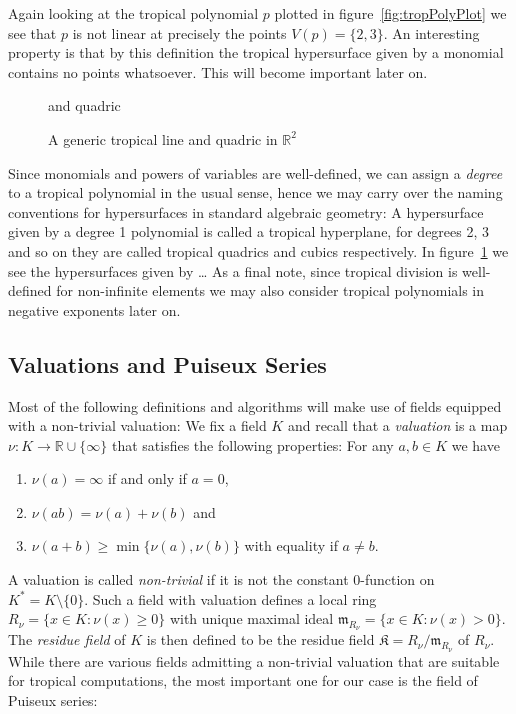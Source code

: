\documentclass[
  paper=a4,
  DIV=14,
  fontsize=12pt,
  titlepage,
  bibliography=totoc,
  listof=totoc,
  pagesize=pdftex
]{scrartcl}
\numberwithin{figure}{section}
\numberwithin{equation}{section}
\numberwithin{table}{section}
\newcommand*\setR{\mathds{R}}
\theoremstyle{definition}
\numberwithin{definition}{section}
\begin{document}
Again looking at the tropical polynomial $p$ plotted in figure~\ref{fig:tropPolyPlot} we
see that $p$ is not linear at precisely the points $V(p) = \{ 2, 3 \}$. An interesting
property is that by this definition the tropical hypersurface given by a monomial contains
no points whatsoever. This will become important later on.

\begin{figure}[tbh]
  \centering
  and quadric
  \caption{A generic tropical line and quadric in $\setR^2$}
  \label{fig:tropLineQuad}
\end{figure}

Since monomials and powers of variables are well-defined, we can assign a \emph{degree} to
a tropical polynomial in the usual sense, hence we may carry over the naming conventions
for hypersurfaces in standard algebraic geometry: A hypersurface given by a degree 1
polynomial is called a tropical hyperplane, for degrees 2, 3 and so on they are called
tropical quadrics and cubics respectively. In figure~\ref{fig:tropLineQuad} we see the
hypersurfaces given by \dots %
As a final note, since tropical division is well-defined for non-infinite elements we may
also consider tropical polynomials in negative exponents later on.

\subsection{Valuations and Puiseux Series}

Most of the following definitions and algorithms will make use of fields equipped with a
non-trivial valuation: We fix a field $K$ and recall that a \emph{valuation} is a map
$\nu:K\to \setR \cup \{\infty\}$ that satisfies the following properties: For any $a, b
\in K$ we have
\begin{enumerate}
  \item $\nu(a) = \infty$ if and only if $a=0$,
  \item $\nu(ab) = \nu(a)+\nu(b)$ and
  \item $\nu(a+b) \geq \min\{\nu(a), \nu(b)\}$ with equality if $a\neq b$.
\end{enumerate}
A valuation is called \emph{non-trivial} if it is not the constant 0-function on $K^* =
K\setminus\{0\}$. Such a field with valuation defines a local ring $R_\nu = \{ x \in K :
\nu(x) \geq 0 \}$ with unique maximal ideal $\mathfrak m_{R_\nu} = \{ x \in K : \nu(x) > 0
\}$. The \emph{residue field} of $K$ is then defined to be the residue field $\mathfrak K
= R_\nu/\mathfrak m_{R_\nu}$ of $R_\nu$.
While there are various fields admitting a non-trivial valuation that
are suitable for tropical computations, the most important one for our case is the field
of Puiseux series:
\end{document}
